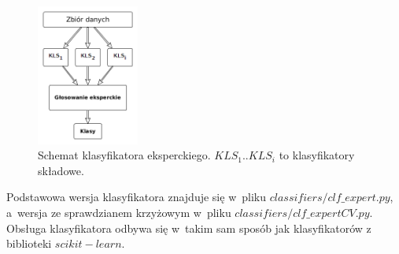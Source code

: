 \begin{figure}[H]
	\centering
	\includegraphics[width=0.3\textwidth]{./images/klas_ekspercki.png}
	\caption[Schemat klasyfikatora eksperckiego]{Schemat klasyfikatora eksperckiego. $KLS_1..KLS_i$ to klasyfikatory składowe.}
	\label{fig:klasyfikator_ekspercki}
\end{figure}
Podstawowa wersja klasyfikatora znajduje się w~pliku $classifiers/clf\_expert.py$, a~wersja ze sprawdzianem krzyżowym w~pliku $classifiers/clf\_expertCV.py$. Obsługa klasyfikatora odbywa się w~takim sam sposób jak klasyfikatorów z biblioteki $scikit-learn$.
